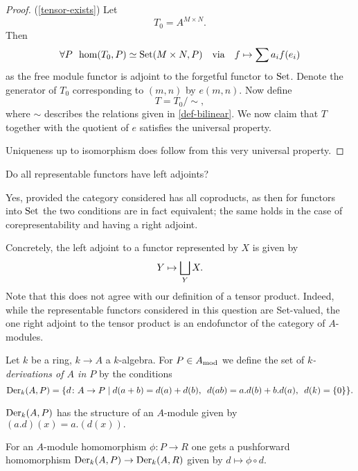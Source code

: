 \begin{proof}(\cref{tensor-exists})
  Let
  \[ T_0 = A^{M \times N}.\]
  Then
  \[ \forall P \enspace \hom(T_0, P) \simeq \text{Set}(M \times N, P) \quad \text{via} \quad  f \mapsto \sum a_i f(e_i)\]
  as the free module functor is adjoint to the forgetful functor to $\text{Set}$.
  Denote the generator of $T_0$ corresponding to $(m, n)$ by $e(m, n)$. Now define
  \[ T = T_0 / {\sim}, \]
  where $\sim$ describes the relations given in \cref{def-bilinear}.
  We now claim that $T$ together with the quotient of $e$ satisfies the universal property.

  Uniqueness up to isomorphism does follow from this very universal property.
\end{proof}

\begin{question}
  Do all representable functors have left adjoints?
\end{question}
\begin{answer}
  Yes, provided the category considered has all coproducts, as then for functors into $\text{Set}$ the two conditions are in fact equivalent; the same holds in the case of corepresentability and having a right adjoint.

  Concretely, the left adjoint to a functor represented by $X$ is given by
  \[ Y \mapsto \bigsqcup_Y X.\]
  Note that this does not agree with our definition of a tensor product. Indeed, while the representable functors considered in this question are Set-valued, the one right adjoint to the tensor product is an endofunctor of the category of $A$-modules.
\end{answer}

\begin{df}
  Let $k$ be a ring,  $k \to A$ a $k$-algebra. For $P \in A_\text{mod}$ we define the set of \emph{\(k\)-derivations of \(A\) in \(P\)} by the conditions
  \[ \operatorname{Der}_k(A, P) = \{ d \colon A \to P \mathrel{|} d(a+b) = d(a) + d(b), \enspace d(ab) = a . d(b) + b . d(a), \enspace d(k) = \{0\} \}.\]
\end{df}

\begin{prop}
  \(\operatorname{Der}_k(A, P)\) has the structure of an \(A\)-module given by \((a.d)(x) = a.(d(x)).\)
\end{prop}

\begin{note}
    For an \(A\)-module homomorphism $\phi \colon P \to R$ one gets a pushforward homomorphism
    \( \operatorname{Der}_k(A, P) \to \operatorname{Der}_k(A, R)\)
    given by
    \(d \mapsto \phi \circ d.\)
\end{note}

